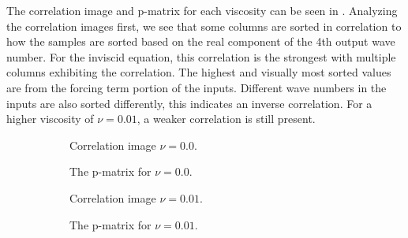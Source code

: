 \documentclass[preprint,12pt,times,authoryear]{elsarticle}
\begin{document}
The correlation image and p-matrix for each viscosity can be seen in . Analyzing the correlation images first, we see that some columns are sorted in correlation to how the samples are sorted based on the real component of the 4th output wave number. For the inviscid equation, this correlation is the strongest with multiple columns exhibiting the correlation. The highest and visually most sorted values are from the forcing term portion of the inputs. Different wave numbers in the inputs are also sorted differently, this indicates an inverse correlation. For a higher viscosity of \(\nu=0.01\), a weaker correlation is still present.
\begin{figure}[hbp]
  \centering
  \begin{subfigure}{0.49\linewidth}
    \centering
    \begin{adjustbox}{height=5.5cm}
      
    \end{adjustbox}
    \caption{Correlation image \(\nu=0.0\).}\label{fig:sc2_ci_0.0}
  \end{subfigure}
  \begin{subfigure}{0.49\linewidth}
    \centering
    \begin{adjustbox}{height=5.5cm}
      
    \end{adjustbox}
    \caption{The p-matrix for \(\nu=0.0\).}\label{fig:sc2_pm_0.0}
  \end{subfigure}
  \begin{subfigure}{0.49\linewidth}
    \centering
    \begin{adjustbox}{height=5.5cm}
      
    \end{adjustbox}
    \caption{Correlation image \(\nu=0.01\).}\label{fig:sc2_ci_0.01}
  \end{subfigure}
  \begin{subfigure}{0.49\linewidth}
    \centering
    \begin{adjustbox}{height=5.5cm}
      
    \end{adjustbox}
    \caption{The p-matrix for \(\nu=0.01\).}\label{fig:sc2_pm_0.01}
  \end{subfigure}
  \begin{subfigure}{0.49\linewidth}
    \centering
    \begin{adjustbox}{height=5.5cm}

\end{adjustbox}
\end{subfigure}
\end{figure}
\end{document}
